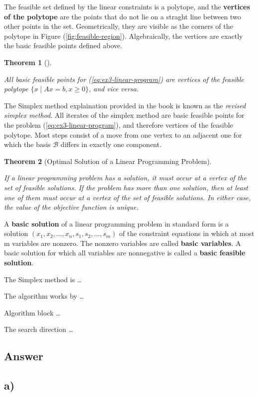 \documentclass[unicode,11pt,a4paper,oneside,numbers=endperiod,openany, draft]{scrartcl}
\newtheorem{theorem}{Theorem}[section]
\newcommand{\myth}[3]{
    \begin{theorem}[#1] 
        \label{#2} 
        #3 
    \end{theorem}
}
\begin{document}
The feasible set defined by the linear constraints is a polytope,
and the \textbf{vertices of the polytope} are the points that do not lie on a straght line
between two other points in the set.
Geometrically,
they are visible as the corners of the polytope in Figure (\ref{fig:feasible-region}).
Algebraically, the vertices are exactly the basic feasible points defined above.

\myth{}{th:ex3-vertices-polytope}{
    All basic feasible points for (\ref{eq:ex3-linear-program})
    are vertices of the feasible polytope
    \( \{ x \mid Ax = b, x \geq 0 \} \),
    and vice versa.
}


The Simplex method explaination provided in the book
is known as the \textit{revised simplex method}.
All iterates of the simplex method are basic feasible points
for the problem (\ref{eq:ex3-linear-program}),
and therefore vertices of the feasible polytope.
Most steps consist of a move from one vertex to an adjacent one
for which the basis \( \mathcal{B} \) differs in exactly one component.

\myth{Optimal Solution of a Linear Programming Problem}{th:linear-programming-solution}{
    If a linear programming problem has a solution,
    it must occur at a vertex of the set of feasible solutions.
    If the problem has more than one solution,
    then at least one of them must occur at a vertex of the set of feasible solutions.
    In either case, the value of the objective function is unique.
}

A \textbf{basic solution} of a linear programming problem in standard form is a solution
\( ( x_1, x_2, \ldots, x_n, s_1, s_2, \ldots, s_m ) \)
of the constraint equations in which at most m variables are nonzero.
The nonzero variables are called \textbf{basic variables}.
A basic solution for which all variables are nonnegative
is called a \textbf{basic feasible solution}.

The Simplex method is \dots

The algorithm works by \dots

Algorithm block \dots

The search direction \dots

\subsection{Answer}

\subsection*{a)}
\end{document}
